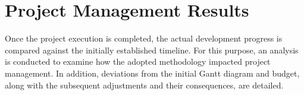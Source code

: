 \section{Project Management Results}
\label{sec:project-management-results}

Once the project execution is completed, the actual development progress is compared against the initially established timeline. For this purpose, an analysis is conducted to examine how the adopted methodology impacted project management. In addition, deviations from the initial Gantt diagram and budget, along with the subsequent adjustments and their consequences, are detailed.





 



